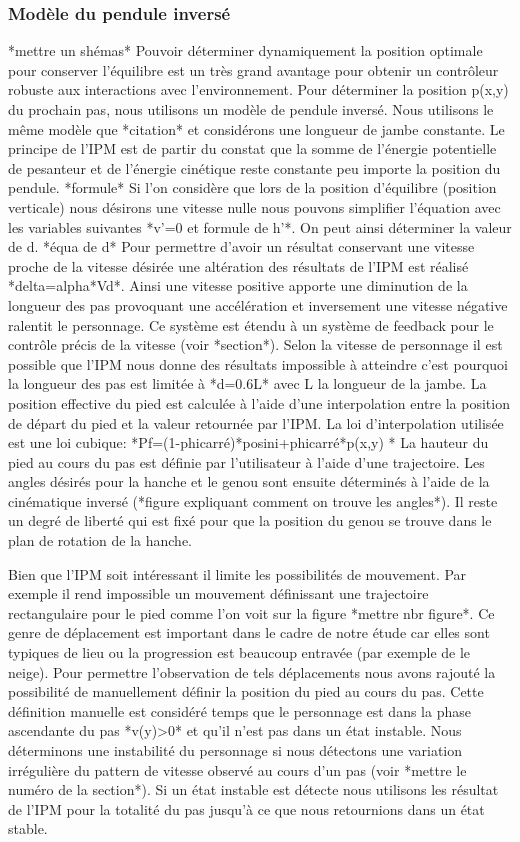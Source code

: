 \documentclass{llncs}
\begin{document}
\subsubsection{Modèle du pendule inversé}
%
*mettre un shémas*
Pouvoir déterminer dynamiquement la position optimale pour conserver l'équilibre est un très grand avantage pour obtenir un contrôleur robuste  aux interactions avec l'environnement. Pour déterminer la position p(x,y) du prochain pas, nous utilisons un modèle de pendule inversé. Nous utilisons le même modèle que *citation* et considérons une longueur de jambe constante.
Le principe de l'IPM est de partir du constat que la somme de l'énergie potentielle de pesanteur et de l'énergie cinétique reste constante peu importe la position du pendule. 
*formule*
Si l'on considère que lors de la position d'équilibre (position verticale) nous désirons une vitesse nulle nous pouvons simplifier l'équation avec les variables suivantes *v'=0 et formule de h'*. On peut ainsi déterminer la valeur de d.
*équa de d*
Pour permettre d'avoir un résultat conservant une vitesse proche de la vitesse désirée une altération des résultats de l'IPM est réalisé *delta=alpha*Vd*. Ainsi une vitesse positive apporte une diminution de la longueur des pas provoquant une accélération et inversement une vitesse négative ralentit le personnage. Ce système est étendu à un système de feedback pour le contrôle précis de la vitesse (voir *section*).
Selon la vitesse de personnage il est possible que l'IPM nous donne des résultats impossible à atteindre c'est pourquoi la longueur des pas est limitée à *d=0.6L* avec L la longueur de la jambe.
La position effective du pied est calculée à l'aide d'une interpolation entre la position de départ du pied et la valeur retournée par l'IPM. La loi d'interpolation utilisée est une loi cubique:
*Pf=(1-phicarré)*posini+phicarré*p(x,y) *
La hauteur du pied au cours du pas est définie par l'utilisateur à l'aide d'une trajectoire.
Les angles désirés pour la hanche et le genou sont ensuite déterminés à l'aide de la cinématique inversé (*figure expliquant comment on trouve les angles*).  Il reste un degré de liberté qui est fixé pour que la position du genou se trouve dans le plan de rotation de la hanche.

Bien que l'IPM soit intéressant il limite les possibilités de mouvement. Par exemple il rend impossible un mouvement définissant une trajectoire rectangulaire pour le pied comme l'on voit sur la figure *mettre nbr figure*. Ce genre de déplacement est important dans le cadre de notre étude car elles sont typiques de lieu ou la progression est beaucoup entravée (par exemple de le neige). Pour permettre l'observation de tels déplacements nous avons rajouté la possibilité de manuellement définir la position du pied au cours du pas. Cette définition manuelle est considéré temps que le personnage est dans la phase ascendante du pas *v(y)>0* et qu'il n'est pas dans un état instable. Nous déterminons une instabilité du personnage si nous détectons une variation irrégulière du pattern de vitesse observé au cours d'un pas (voir *mettre le numéro de la section*). Si un état instable est détecte nous utilisons les résultat de l'IPM pour la totalité du pas jusqu'à ce que nous retournions dans un état stable.
\end{document}
